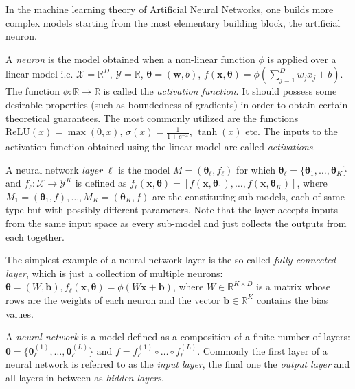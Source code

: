 In the machine learning theory of Artificial Neural Networks, one builds more complex models starting from the most elementary building block, the artificial neuron.
\begin{definition}
A \emph{neuron} is the model obtained when a non-linear function $\phi$ is applied over a linear model i.e. $\mathcal{X} = \mathbb{R}^D$, $\mathcal{Y}=\mathbb{R}$, $\pmb{\theta} = (\pmb{w}, b)$, $f(\pmb{x}, \pmb{\theta}) = \phi\left(\sum_{j=1}^{D}{w_j x_j} + b\right)$. The function $\phi: \mathbb{R} \to \mathbb{R}$ is called the \emph{activation function}. It should possess some desirable properties (such as boundedness of gradients) in order to obtain certain theoretical guarantees. The most commonly utilized are the functions $\text{ReLU}(x)=\max(0,x)$, $\sigma(x)=\frac{1}{1+e^{-x}}$, $\tanh(x)$ etc. The inputs to the activation function obtained using the linear model are called \emph{activations}.
\end{definition}

\begin{definition}
A neural network \emph{layer} $\ell$ is the model $M = (\pmb{\theta}_{\ell}, f_{\ell})$ for which $\pmb{\theta}_{\ell} = \{\pmb{\theta}_1, \dots, \pmb{\theta}_K\}$ and $f_{\ell}: \mathcal{X} \to \mathcal{Y}^K$ is defined as $f_{\ell}(\pmb{x}, \pmb{\theta}) = [f(\pmb{x}, \pmb{\theta}_1),\dots,f(\pmb{x}, \pmb{\theta}_K)]$, where $M_1=(\pmb{\theta}_1, f),\dots,M_K=(\pmb{\theta}_K, f)$ are the constituting sub-models, each of same type but with possibly different parameters. Note that the layer accepts inputs from the same input space as every sub-model and just collects the outputs from each together.
\end{definition}

The simplest example of a neural network layer is the so-called \emph{fully-connected layer}, which is just a collection of multiple neurons: $\pmb{\theta}=(W, \pmb{b}), f_{\ell}(\pmb{x}, \pmb{\theta}) = \phi\left(W\pmb{x} + \pmb{b}\right)$, where $W \in \mathbb{R}^{K \times D}$ is a matrix whose rows are the weights of each neuron and the vector $\pmb{b} \in \mathbb{R}^K$ contains the bias values.

\begin{definition}
A \emph{neural network} is a model defined as a composition of a finite number of layers: $\pmb{\theta}=\{\pmb{\theta}_{\ell}^{(1)},\dots,\pmb{\theta}_{\ell}^{(L)}\}$ and $f = f_{\ell}^{(1)} \circ \dots \circ f_{\ell}^{(L)}$. Commonly the first layer of a neural network is referred to as the \emph{input layer}, the final one the \emph{output layer} and all layers in between as \emph{hidden layers}. 
\end{definition}


